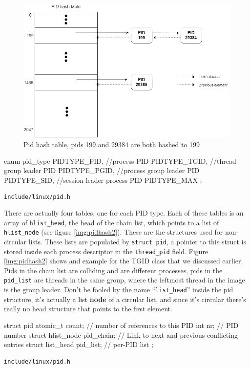 \documentclass[10pt]{book}
\begin{document}
\begin{figure}[ht]
\includegraphics[width=\textwidth]{images/pidhash1.png}
\caption{Pid hash table, pids 199 and 29384 are both hashed to 199}
\label{img:pidhash1}
\end{figure}

\begin{code}
enum pid_type {
	PIDTYPE_PID,  //process PID
	PIDTYPE_TGID, //thread group leader PID
	PIDTYPE_PGID, //process group leader PID
	PIDTYPE_SID,  //session leader process PID
	PIDTYPE_MAX
};
\end{code}
\verb|include/linux/pid.h|

There are actually four tables, one for each PID type. Each of these tables is an array of \verb|hlist_head|, the head of the chain list, which points to a list of \verb|hlist_node| (see figure \ref{img:pidhash2}). These are the structures used for non-circular lists. These lists are populated by \verb|struct pid|, a pointer to this struct is stored inside each process descriptor in the \verb|thread_pid| field. Figure \ref{img:pidhash2} shows and example for the TGID class that we discussed earlier. Pids in the chain list are colliding and are different processes, pids in the \verb|pid_list| are threads in the same group, where the leftmost thread in the image is the group leader. Don't be fooled by the name ``\verb|list_head|'' inside the pid structure, it's actually a list \textbf{node} of a circular list, and since it's circular there's really no head structure that points to the first element. %

\begin{code}
struct pid {
        atomic_t count; // number of references to this PID
	int nr; // PID number
	struct hlist_node pid_chain; // Link to next and previous conflicting entries
	struct list_head pid_list;  // per-PID list
};
\end{code}
\verb|include/linux/pid.h|
\end{document}
